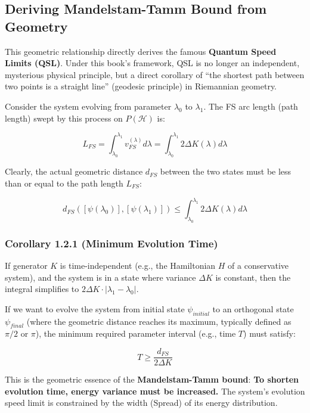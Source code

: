 \documentclass[11pt,a4paper,twoside]{book}
\begin{document}
\subsection{Deriving Mandelstam-Tamm Bound from Geometry}

This geometric relationship directly derives the famous \textbf{Quantum Speed Limits (QSL)}. Under this book's framework, QSL is no longer an independent, mysterious physical principle, but a direct corollary of ``the shortest path between two points is a straight line'' (geodesic principle) in Riemannian geometry.

Consider the system evolving from parameter \textbf{$\lambda_0$} to \textbf{$\lambda_1$}. The FS arc length (path length) swept by this process on \textbf{$P(\mathcal{H})$} is:

$$L_{FS} = \int_{\lambda_0}^{\lambda_1} v_{FS}^{(\lambda)} d\lambda = \int_{\lambda_0}^{\lambda_1} 2\Delta K(\lambda) d\lambda$$

Clearly, the actual geometric distance \textbf{$d_{FS}$} between the two states must be less than or equal to the path length \textbf{$L_{FS}$}:

$$d_{FS}([\psi(\lambda_0)], [\psi(\lambda_1)]) \le \int_{\lambda_0}^{\lambda_1} 2\Delta K(\lambda) d\lambda$$

\subsubsection{Corollary 1.2.1 (Minimum Evolution Time)}

If generator \textbf{$K$} is time-independent (e.g., the Hamiltonian \textbf{$H$} of a conservative system), and the system is in a state where variance \textbf{$\Delta K$} is constant, then the integral simplifies to \textbf{$2\Delta K \cdot |\lambda_1 - \lambda_0|$}.

If we want to evolve the system from initial state \textbf{$\psi_{initial}$} to an orthogonal state \textbf{$\psi_{final}$} (where the geometric distance reaches its maximum, typically defined as \textbf{$\pi/2$} or \textbf{$\pi$}), the minimum required parameter interval (e.g., time \textbf{$T$}) must satisfy:

$$T \ge \frac{d_{FS}}{2\Delta K}$$

This is the geometric essence of the \textbf{Mandelstam-Tamm bound}: \textbf{To shorten evolution time, energy variance must be increased.} The system's evolution speed limit is constrained by the width (Spread) of its energy distribution.
\end{document}
